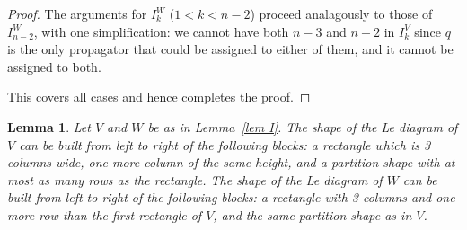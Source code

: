 \documentclass[11pt]{article}
\newtheorem{lem}[thm]{Lemma}
\theoremstyle{remark}
\theoremstyle{definition}
\begin{document}
\begin{proof}
The arguments for $I_k^{W}$ ($1< k < n-2$) proceed analagously to those of $I_{n-2}^{W}$, with one simplification: we cannot have both $n-3$ and $n-2$ in $I_k^{V}$ since $q$ is the only propagator that could be assigned to either of them, and it cannot be assigned to both.

This covers all cases and hence completes the proof.
\end{proof}


\begin{lem}\label{lem shape}
  Let $V$ and $W$ be as in Lemma~\ref{lem I}.
  The shape of the Le diagram of $V$ can be built from left to right of the following blocks: a rectangle which is 3 columns wide, one more column of the same height, and a partition shape with at most as many rows as the rectangle.
  The shape of the Le diagram of $W$ can be built from left to right of the following blocks: a rectangle with 3 columns and one more row than the first rectangle of $V$, and the same partition shape as in $V$.
\end{lem}
\end{document}
